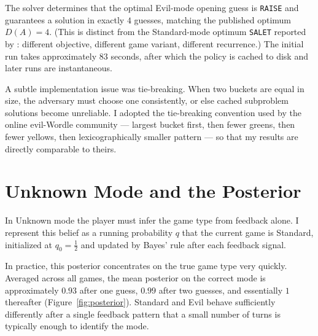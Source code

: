 \documentclass[11pt]{article}
\begin{document}
The solver determines that the optimal Evil-mode opening guess is
\texttt{RAISE} and guarantees a solution in exactly $4$ guesses,
matching the published optimum $D(A) = 4$. (This is distinct from the
Standard-mode optimum \texttt{SALET} reported by
\citet{bertsimas2022wordle}: different objective, different game
variant, different recurrence.) The initial run takes approximately
$83$ seconds, after which the policy is cached to disk and later runs
are instantaneous.

A subtle implementation issue was tie-breaking. When two buckets are
equal in size, the adversary must choose one consistently, or else
cached subproblem solutions become unreliable. I adopted the
tie-breaking convention used by the online evil-Wordle community ---
largest bucket first, then fewer greens, then fewer yellows, then
lexicographically smaller pattern --- so that my results are directly
comparable to theirs.

\section*{Unknown Mode and the Posterior}

In Unknown mode the player must infer the game type from feedback
alone. I represent this belief as a running probability $q$ that the
current game is Standard, initialized at $q_0 = \tfrac12$ and updated
by Bayes' rule after each feedback signal.

In practice, this posterior concentrates on the true game type very
quickly. Averaged across all games, the mean posterior on the correct
mode is approximately $0.93$ after one guess, $0.99$ after two
guesses, and essentially $1$ thereafter (Figure~\ref{fig:posterior}).
Standard and Evil behave sufficiently differently after a single
feedback pattern that a small number of turns is typically enough to
identify the mode.
\end{document}

